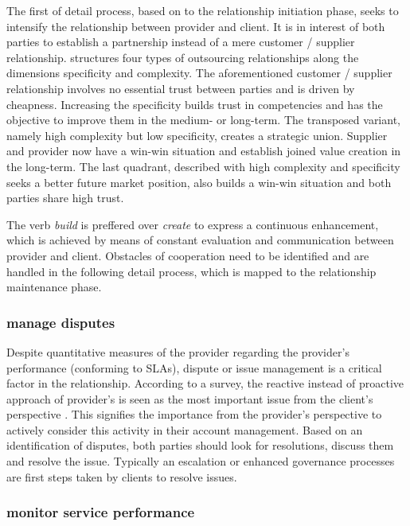 	The first of detail process, based on to the relationship initiation phase, seeks to intensify the relationship between provider and client. It is in interest of both parties to establish a partnership instead of a mere customer / supplier relationship. \cite{Franceschini_2003} structures four types of outsourcing relationships along the dimensions specificity and complexity. The aforementioned customer / supplier relationship involves no essential trust between parties and is driven by cheapness. Increasing the specificity builds trust in competencies and has the objective to improve them in the medium- or long-term. The transposed variant, namely high complexity but low specificity, creates a strategic union. Supplier and provider now have a win-win situation and establish joined value creation in the long-term. The last quadrant, described with high complexity and specificity seeks a better future market position, also builds a win-win situation and both parties share high trust. 
	
	The verb \textit{build} is preffered over \textit{create} to express a continuous enhancement, which is achieved by means of constant evaluation and communication between provider and client. Obstacles of cooperation need to be identified and are handled in the following detail process, which is mapped to the relationship maintenance phase. 
		
	\subsubsection{manage disputes}
	
	Despite quantitative measures of the provider regarding the provider's performance (\eg conforming to \acrshort{SLA}s), dispute or issue management is a critical factor in the relationship. According to a survey, the reactive instead of proactive approach of provider's is seen as the most important issue from the client's perspective \citep{deloitte2014outsourcing}. This signifies the importance from the provider's perspective to actively consider this activity in their account management. Based on an identification of disputes, both parties should look for resolutions, discuss them and resolve the issue. Typically an escalation or enhanced governance processes are first steps taken by clients to resolve issues.
	
	\subsubsection{monitor service performance}
	
